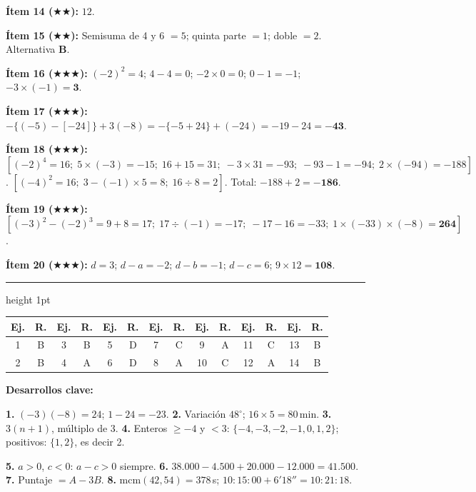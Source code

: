 \documentclass[11pt, letterpaper]{article}
\newcommand{\subbloque}[1]{%
  \vspace{14pt}
  \noindent{\large\bfseries\color{zenitnavy} #1}\par
  \vspace{4pt}\hrule height 1pt\vspace{8pt}}
\begin{document}
\textbf{\'Item 14 ($\bigstar\bigstar$):} $12$.

\textbf{\'Item 15 ($\bigstar\bigstar$):} Semisuma de 4 y 6 $=5$; quinta parte $=1$; doble $=2$. Alternativa \textbf{B}.

\textbf{\'Item 16 ($\bigstar\bigstar\bigstar$):} $(-2)^2=4$; $4-4=0$; $-2\times 0=0$; $0-1=-1$; $-3\times(-1)=\mathbf{3}$.

\textbf{\'Item 17 ($\bigstar\bigstar\bigstar$):} $-\{(-5)-[-24]\}+3(-8)=-\{-5+24\}+(-24)=-19-24=\mathbf{-43}$.

\textbf{\'Item 18 ($\bigstar\bigstar\bigstar$):} $[(-2)^4=16;\;5\times(-3)=-15;\;16+15=31;\;-3\times 31=-93;\;-93-1=-94;\;2\times(-94)=-188]$. $[(-4)^2=16;\;3-(-1)\times 5=8;\;16\div 8=2]$. Total: $-188+2=\mathbf{-186}$.

\textbf{\'Item 19 ($\bigstar\bigstar\bigstar$):} $[(-3)^2-(-2)^3=9+8=17;\;17\div(-1)=-17;\;-17-16=-33;\;1\times(-33)\times(-8)=\mathbf{264}]$.

\textbf{\'Item 20 ($\bigstar\bigstar\bigstar$):} $d=3$; $d-a=-2$; $d-b=-1$; $d-c=6$; $9\times 12=\mathbf{108}$.

\subbloque{Ejercicios tipo PAES}

\begin{center}
\renewcommand{\arraystretch}{1.3}
\begin{tabular}{c|c||c|c||c|c||c|c||c|c||c|c||c|c}
\toprule
\textbf{Ej.} & \textbf{R.} & \textbf{Ej.} & \textbf{R.} & \textbf{Ej.} & \textbf{R.} & \textbf{Ej.} & \textbf{R.} & \textbf{Ej.} & \textbf{R.} & \textbf{Ej.} & \textbf{R.} & \textbf{Ej.} & \textbf{R.}\\
\midrule
1 & B & 3 & B & 5 & D & 7 & C & 9 & A & 11 & C & 13 & B\\
2 & B & 4 & A & 6 & D & 8 & A & 10 & C & 12 & A & 14 & B\\
\bottomrule
\end{tabular}
\end{center}

\medskip
\textbf{Desarrollos clave:}

\textbf{1.} $(-3)(-8)=24$; $1-24=-23$. \quad \textbf{2.} Variaci\'on $48^\circ$; $16\times 5=80$\,min. \quad \textbf{3.} $3(n+1)$, m\'ultiplo de 3. \quad \textbf{4.} Enteros $\geq -4$ y $<3$: $\{-4,-3,-2,-1,0,1,2\}$; positivos: $\{1,2\}$, es decir 2.

\textbf{5.} $a>0$, $c<0$: $a-c>0$ siempre. \quad \textbf{6.} $38.000-4.500+20.000-12.000=41.500$. \quad \textbf{7.} Puntaje $=A-3B$. \quad \textbf{8.} $\text{mcm}(42,54)=378$\,s; $10{:}15{:}00+6'18''=10{:}21{:}18$.
\end{document}
